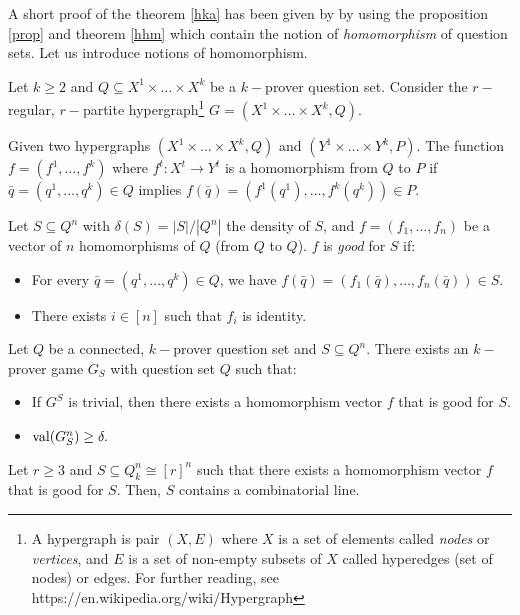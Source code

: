 A short proof of the theorem \eqref{hka} has been given by \cite{hkazla2016forbidden} by using the proposition \eqref{prop} and theorem \eqref{hhm} which contain  the notion of \textit{homomorphism} of question sets. Let us introduce notions of homomorphism.

Let $k\geq 2$ and $Q \subseteq X^1 \times \ldots \times X^k$ be a $k-$prover question set. Consider the $r-$regular, $r-$partite hypergraph\footnote{A hypergraph is pair $(X,E)$ where $X$ is a set of elements called \textit{nodes} or \textit{vertices}, and $E$ is a set of non-empty subsets of $X$ called hyperedges (set of nodes) or edges. For further reading, see https://en.wikipedia.org/wiki/Hypergraph} $G=(X^1 \times \ldots \times X^k, Q).$

 Given two hypergraphs $(X^1 \times \ldots \times X^k, Q)$ and $(Y^1 \times \ldots \times Y^k, P)$. The function $f=(f^1, \ldots, f^k)$ where $f^t: X^t \longrightarrow Y^t$ is a homomorphism from $Q$ to $P$ if $\bar{q}=(q^1, \ldots,q^k) \in Q$ implies $f(\bar{q})=(f^1(q^1), \ldots,f^k(q^k)) \in P.$

Let $S\subseteq Q^n$ with $\delta(S)= |S|/|Q^n|$ the density of $S$, and $f=(f_1, \ldots, f_n)$ be a vector of $n$ homomorphisms of $Q$ (from $Q$ to $Q$). $f$ is \textit{good} for $S$ if:
\begin{itemize}
\item For every $\bar{q}=(q^1, \ldots,q^k) \in Q$, we have $f(\bar{q})=(f_1(\bar{q}), \ldots, f_n(\bar{q})) \in S.$
\item There exists $i \in  [n]$ such that $f_i$ is identity.
\end{itemize}


\begin{thm}	Let $Q$ be a connected, $k-$prover question set and $S \subseteq Q^n$. There exists an $k-$prover game $G_S$ with question set $Q$ such that:
\begin{itemize}
\item If $G^S$ is trivial, then there exists a homomorphism vector $f$ that is good for $S$.
\item $\mathrm{val} (G_S^n) \geq \delta.$
\end{itemize} \label{hhm}	\end{thm} 

\begin{pro}	Let $r \geq 3$ and $S \subseteq Q_k^n \cong [r]^n$ such that there exists a homomorphism vector $f$ that is good for $S$. Then, $S$ contains a combinatorial line.	\label{prop}\end{pro}
 
